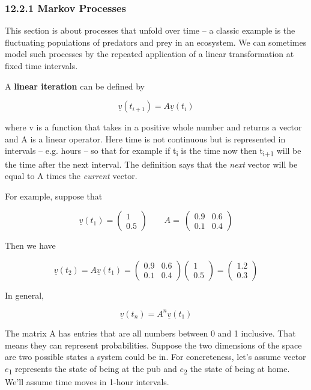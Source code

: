 \documentclass[oneside,english]{amsbook}
\numberwithin{section}{chapter}
\theoremstyle{plain}
\theoremstyle{definition}
\begin{document}
\subsubsection{12.2.1 Markov Processes}\label{markov-processes}

This section is about processes that unfold over time -- a classic
example is the fluctuating populations of predators and prey in an
ecosystem. We can sometimes model such processes by the repeated
application of a linear transformation at fixed time intervals.

A \textbf{linear iteration} can be defined by

\[\underline{v}\left( t_{i + 1} \right) = A\underline{v}(t_{i})\]

where v is a function that takes in a positive whole number and returns
a vector and A is a linear operator. Here time is not continuous but is
represented in intervals -- e.g. hours -- so that for example if
t\textsubscript{i} is the time now then t\textsubscript{i+1} will be the
time after the next interval. The definition says that the \emph{next}
vector will be equal to A times the \emph{current} vector.

For example, suppose that

\[\underline{v}\left( t_{1} \right) = \begin{pmatrix}
	1 \\
	0.5
\end{pmatrix}\ \ \ \ \ \ \ \ \ A = \ \begin{pmatrix}
	0.9 & 0.6 \\
	0.1 & 0.4
\end{pmatrix}\]

Then we have

\[{\underline{v}\left( t_{2} \right) = A\underline{v}\left( t_{1} \right)
}{= \begin{pmatrix}
		0.9 & 0.6 \\
		0.1 & 0.4
	\end{pmatrix}\begin{pmatrix}
		1 \\
		0.5
	\end{pmatrix}
}{= \begin{pmatrix}
		1.2 \\
		0.3
\end{pmatrix}}\]

In general,

\[\underline{v}\left( t_{n} \right) = A^{n}\underline{v}\left( t_{1} \right)\]

The matrix A has entries that are all numbers between 0 and 1 inclusive.
That means they can represent probabilities. Suppose the two dimensions
of the space are two possible states a system could be in. For
concreteness, let's assume vector $e$\textsubscript{1} represents the
state of being at the pub and $e$\textsubscript{2} the state of being
at home. We'll assume time moves in 1-hour intervals.
\end{document}
